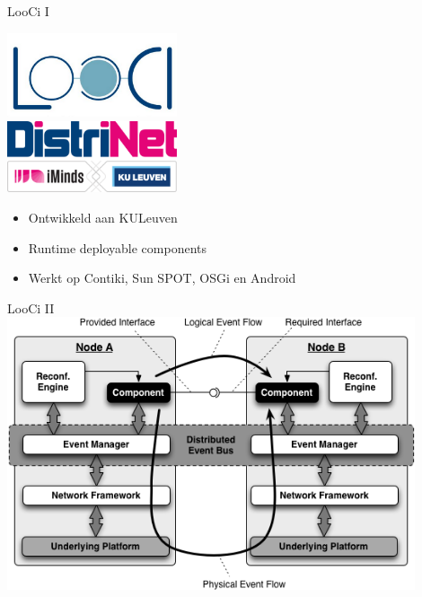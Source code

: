 \documentclass[presentation, bigger]{beamer}
\begin{document}
\begin{frame}[label=sec-2-3]{LooCi I}
  \begin{minipage}{.5\textwidth}
    \centering
    \includegraphics[width=5cm,keepaspectration=true]{looci/looci.png}\\
    \includegraphics[width=5cm,keepaspectration=true]{looci/distrinet.png}
  \end{minipage}%
  \begin{minipage}{.5\textwidth}
    \centering
    \begin{itemize}
    \item Ontwikkeld aan KULeuven
    \item Runtime deployable components
    \item Werkt op Contiki, Sun SPOT, OSGi en Android
    \end{itemize}
  \end{minipage}%
\end{frame}

\begin{frame}[label=sec-2-4]{LooCi II}
  \centering
  \includegraphics[width=0.9\textwidth,keepaspectration=true]{looci/LooCIExecEnvironment.png}
\end{frame}
\end{document}
